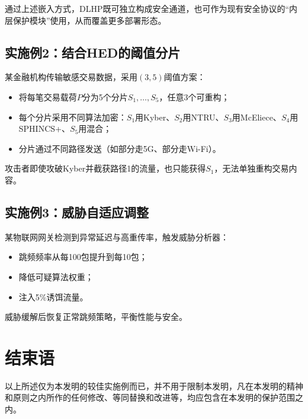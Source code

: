 \documentclass[12pt,a4paper]{article}
\begin{document}
通过上述嵌入方式，DLHP既可独立构成安全通道，也可作为现有安全协议的“内层保护模块”使用，从而覆盖更多部署形态。

\subsection{实施例2：结合HED的阈值分片}

某金融机构传输敏感交易数据，采用$(3,5)$阈值方案：

\begin{itemize}
    \item 将每笔交易载荷$P$分为5个分片$S_1, \ldots, S_5$，任意3个可重构；
    \item 每个分片采用不同算法加密：$S_1$用Kyber、$S_2$用NTRU、$S_3$用McEliece、$S_4$用SPHINCS+、$S_5$用混合；
    \item 分片通过不同路径发送（如部分走5G、部分走Wi-Fi）。
\end{itemize}

攻击者即使攻破Kyber并截获路径1的流量，也只能获得$S_1$，无法单独重构交易内容。

\subsection{实施例3：威胁自适应调整}

某物联网网关检测到异常延迟与高重传率，触发威胁分析器：

\begin{itemize}
    \item 跳频频率从每100包提升到每10包；
    \item 降低可疑算法权重；
    \item 注入5\%诱饵流量。
\end{itemize}

威胁缓解后恢复正常跳频策略，平衡性能与安全。

\section{结束语}

以上所述仅为本发明的较佳实施例而已，并不用于限制本发明，凡在本发明的精神和原则之内所作的任何修改、等同替换和改进等，均应包含在本发明的保护范围之内。
\end{document}
